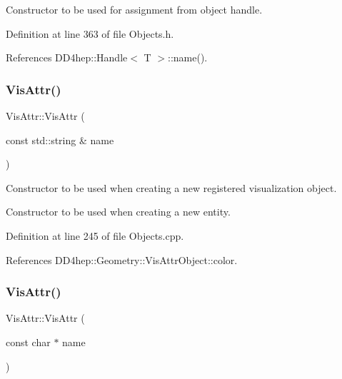 Constructor to be used for assignment from object handle. 



Definition at line 363 of file Objects.\+h.



References D\+D4hep\+::\+Handle$<$ T $>$\+::name().

\hypertarget{class_d_d4hep_1_1_geometry_1_1_vis_attr_a2f0da398224287451179272dbbb3c1d9}{}\label{class_d_d4hep_1_1_geometry_1_1_vis_attr_a2f0da398224287451179272dbbb3c1d9} 
\subsubsection{\texorpdfstring{Vis\+Attr()}{VisAttr()}\hspace{0.1cm}{\footnotesize\ttfamily [5/6]}}
{\footnotesize\ttfamily Vis\+Attr\+::\+Vis\+Attr (\begin{DoxyParamCaption}\item[{const std\+::string \&}]{name }\end{DoxyParamCaption})}



Constructor to be used when creating a new registered visualization object. 

Constructor to be used when creating a new entity. 

Definition at line 245 of file Objects.\+cpp.



References D\+D4hep\+::\+Geometry\+::\+Vis\+Attr\+Object\+::color.

\hypertarget{class_d_d4hep_1_1_geometry_1_1_vis_attr_aba0f08cd43ea7d03cf730c5549356fa6}{}\label{class_d_d4hep_1_1_geometry_1_1_vis_attr_aba0f08cd43ea7d03cf730c5549356fa6} 
\subsubsection{\texorpdfstring{Vis\+Attr()}{VisAttr()}\hspace{0.1cm}{\footnotesize\ttfamily [6/6]}}
{\footnotesize\ttfamily Vis\+Attr\+::\+Vis\+Attr (\begin{DoxyParamCaption}\item[{const char $\ast$}]{name }\end{DoxyParamCaption})}



